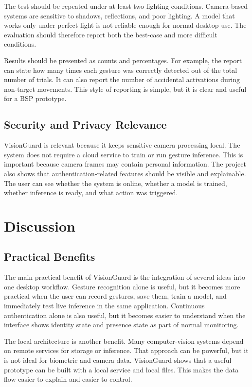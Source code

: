 \documentclass[10pt,twocolumn]{article}
\begin{document}
The test should be repeated under at least two lighting conditions.
Camera-based systems are sensitive to shadows, reflections, and poor lighting.
A model that works only under perfect light is not reliable enough for normal desktop use.
The evaluation should therefore report both the best-case and more difficult conditions.

Results should be presented as counts and percentages.
For example, the report can state how many times each gesture was correctly detected out of the total number of trials.
It can also report the number of accidental activations during non-target movements.
This style of reporting is simple, but it is clear and useful for a BSP prototype.

\subsection{Security and Privacy Relevance}
VisionGuard is relevant because it keeps sensitive camera processing local.
The system does not require a cloud service to train or run gesture inference.
This is important because camera frames may contain personal information.
The project also shows that authentication-related features should be visible and explainable.
The user can see whether the system is online, whether a model is trained, whether inference is ready, and what action was triggered.

\section{Discussion}
\subsection{Practical Benefits}
The main practical benefit of VisionGuard is the integration of several ideas into one desktop workflow.
Gesture recognition alone is useful, but it becomes more practical when the user can record gestures, save them, train a model, and immediately test live inference in the same application.
Continuous authentication alone is also useful, but it becomes easier to understand when the interface shows identity state and presence state as part of normal monitoring.

The local architecture is another benefit.
Many computer-vision systems depend on remote services for storage or inference.
That approach can be powerful, but it is not ideal for biometric and camera data.
VisionGuard shows that a useful prototype can be built with a local service and local files.
This makes the data flow easier to explain and easier to control.
\end{document}

